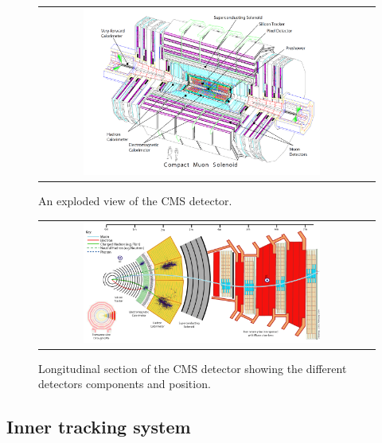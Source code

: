 \begin{figure}[tbh!]
	\centering
	\begin{tabular}{cc}
		\includegraphics[width=0.75\textwidth]{detector/pics/CMS_apparatus.png}
	\end{tabular}
	\caption{An exploded view of the CMS detector.}
	\label{fig:CMS_apparatus}
\end{figure}

\begin{figure}[tbh!]
	\centering
	\begin{tabular}{cc}
		\includegraphics[width=0.75\textwidth]{detector/pics/CMS_slice.png}
	\end{tabular}
	\caption{Longitudinal section of the CMS detector showing the different detectors components and position.}
	\label{fig:CMS_slice}
\end{figure}

\subsection{Inner tracking system}

